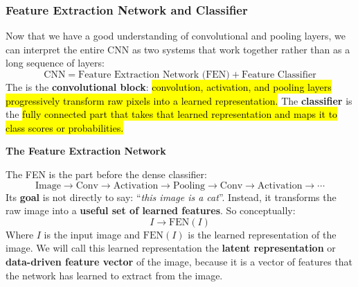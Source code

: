 \subsubsection{Feature Extraction Network and Classifier}\label{sec:feature-extraction-network-and-classifier}

Now that we have a good understanding of convolutional and pooling layers, we can interpret the entire CNN as two systems that work together rather than as a long sequence of layers:
\begin{equation*}
    \text{CNN} = \text{Feature Extraction Network (FEN)} + \text{Feature Classifier}
\end{equation*} 
The  is the \textbf{convolutional block}: \hl{convolution, activation, and pooling layers progressively transform raw pixels into a learned representation.} The \textbf{classifier} is the \hl{fully connected part that takes that learned representation and maps it to class scores or probabilities.}

\highspace
\begin{flushleft}
    \textcolor{Green3}{ \textbf{The Feature Extraction Network}}
\end{flushleft}
The FEN is the part before the dense classifier:
\begin{equation*}
    \text{Image} \to \text{Conv} \to \text{Activation} \to \text{Pooling} \to \text{Conv} \to \text{Activation} \to \cdots
\end{equation*}
Its \textbf{goal} is not directly to say: ``\emph{this image is a cat}''. Instead, it transforms the raw image into a \textbf{useful set of learned features}. So conceptually:
\begin{equation*}
    I \longrightarrow \mathrm{FEN}(I)
\end{equation*}
Where $I$ is the input image and $\mathrm{FEN}(I)$ is the learned representation of the image. We will call this learned representation the \textbf{latent representation} or \textbf{data-driven feature vector} of the image, because it is a vector of features that the network has learned to extract from the image.

